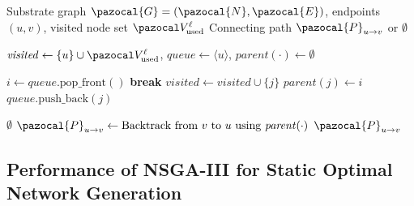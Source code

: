 \documentclass[a4paper,fleqn]{cas-sc}
\begin{document}
\begin{algorithm}[htbp]
\small
\caption{Feasibility-Oriented Path Completion for Line Repair}
\label{alg:bfs_repair}
\begin{algorithmic}[1]
    \renewcommand{\algorithmicrequire}{\textbf{Input:}}
    \renewcommand{\algorithmicensure}{\textbf{Output:}}
    
    \REQUIRE Substrate graph $\pazocal{G}=(\pazocal{N}, \pazocal{E})$, endpoints $(u, v)$, visited node set $\pazocal V_{\mathrm{used}}^\ell$
    \ENSURE Connecting path $\pazocal{P}_{u \to v}$ or $\emptyset$
    
    \STATE $\mathit{visited} \gets \{u\} \cup \pazocal V_{\mathrm{used}}^\ell$, $\mathit{queue} \gets \langle u \rangle$, $\mathit{parent}(\cdot) \gets \emptyset$
    
        \STATE $i \gets \mathit{queue}.\text{pop\_front}()$
            \STATE \textbf{break}
        \ENDIF
                \STATE $\mathit{visited} \gets \mathit{visited} \cup \{j\}$
                \STATE $\mathit{parent}(j) \gets i$
                \STATE $\mathit{queue}.\text{push\_back}(j)$
            \ENDIF
        \ENDFOR
    \ENDWHILE
    
        \RETURN $\emptyset$
    \ENDIF
    \STATE $\pazocal{P}_{u \to v} \gets \text{Backtrack from } v \text{ to } u \text{ using } \mathit{parent}(\cdot)$
    \RETURN $\pazocal{P}_{u \to v}$
\end{algorithmic}
\end{algorithm}

\subsection{Performance of NSGA-III for Static Optimal Network Generation}
\end{document}
